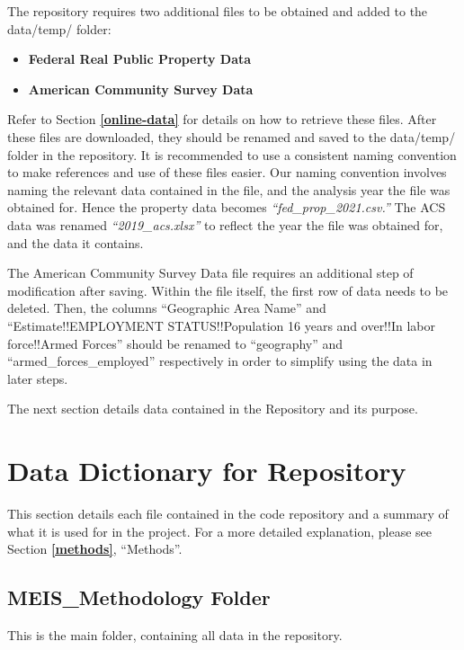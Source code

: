 \documentclass[
]{book}
\providecommand{\tightlist}{%
  \setlength{\itemsep}{0pt}\setlength{\parskip}{0pt}}
\begin{document}
The repository requires two additional files to be obtained and added to the data/temp/ folder:

\begin{itemize}
\tightlist
\item
  \textbf{Federal Real Public Property Data}
\item
  \textbf{American Community Survey Data}
\end{itemize}

Refer to Section \textbf{\ref{online-data}} for details on how to retrieve these files. After these files are downloaded, they should be renamed and saved to the data/temp/ folder in the repository. It is recommended to use a consistent naming convention to make references and use of these files easier. Our naming convention involves naming the relevant data contained in the file, and the analysis year the file was obtained for. Hence the property data becomes \emph{``fed\_prop\_2021.csv.''} The ACS data was renamed \emph{``2019\_acs.xlsx''} to reflect the year the file was obtained for, and the data it contains.

The American Community Survey Data file requires an additional step of modification after saving. Within the file itself, the first row of data needs to be deleted. Then, the columns ``Geographic Area Name'' and ``Estimate!!EMPLOYMENT STATUS!!Population 16 years and over!!In labor force!!Armed Forces'' should be renamed to ``geography'' and ``armed\_forces\_employed'' respectively in order to simplify using the data in later steps.

The next section details data contained in the Repository and its purpose.

\hypertarget{data-dictionary-for-repository}{%
\chapter{Data Dictionary for Repository}\label{data-dictionary-for-repository}}

This section details each file contained in the code repository and a summary of what it is used for in the project. For a more detailed explanation, please see Section \textbf{\ref{methods}}, ``Methods''.

\hypertarget{MEIS-folder}{%
\section{MEIS\_Methodology Folder}\label{MEIS-folder}}

This is the main folder, containing all data in the repository.
\end{document}
